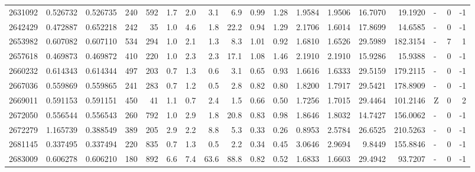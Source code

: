 \begin{tabular}{rrrrrrrrrrrrrrrlrr}
   2631092 & 0.526732 &   0.526735 &  240 &  592 &      1.7 &      2.0 &     3.1 &      6.9 &       0.99 &        1.28 &  1.9584 &  1.9506 &   16.7070 &   19.1920 &             - &        0 &         -1 \\
   2642429 & 0.472887 &   0.652218 &  242 &   35 &      1.0 &      4.6 &     1.8 &     22.2 &       0.94 &        1.29 &  2.1706 &  1.6014 &   17.8699 &   14.6585 &             - &        0 &         -1 \\
   2653982 & 0.607082 &   0.607110 &  534 &  294 &      1.0 &      2.1 &     1.3 &      8.3 &       1.01 &        0.92 &  1.6810 &  1.6526 &   29.5989 &  182.3154 &             - &        7 &          1 \\
   2657618 & 0.469873 &   0.469872 &  410 &  220 &      1.0 &      2.3 &     2.3 &     17.1 &       1.08 &        1.46 &  2.1910 &  2.1910 &   15.9286 &   15.9388 &             - &        0 &         -1 \\
   2660232 & 0.614343 &   0.614344 &  497 &  203 &      0.7 &      1.3 &     0.6 &      3.1 &       0.65 &        0.93 &  1.6616 &  1.6333 &   29.5159 &  179.2115 &             - &        0 &         -1 \\
   2667036 & 0.559869 &   0.559865 &  241 &  283 &      0.7 &      1.2 &     0.5 &      2.8 &       0.82 &        0.80 &  1.8200 &  1.7917 &   29.5421 &  178.8909 &             - &        0 &         -1 \\
   2669011 & 0.591153 &   0.591151 &  450 &   41 &      1.1 &      0.7 &     2.4 &      1.5 &       0.66 &        0.50 &  1.7256 &  1.7015 &   29.4464 &  101.2146 &             Z &        0 &          2 \\
   2672050 & 0.556544 &   0.556543 &  260 &  792 &      1.0 &      2.9 &     1.8 &     20.8 &       0.83 &        0.98 &  1.8646 &  1.8032 &   14.7427 &  156.0062 &             - &        0 &         -1 \\
   2672279 & 1.165739 &   0.388549 &  389 &  205 &      2.9 &      2.2 &     8.8 &      5.3 &       0.33 &        0.26 &  0.8953 &  2.5784 &   26.6525 &  210.5263 &             - &        0 &         -1 \\
   2681145 & 0.337495 &   0.337494 &  220 &  835 &      0.7 &      1.3 &     0.5 &      2.2 &       0.34 &        0.45 &  3.0646 &  2.9694 &    9.8449 &  155.8846 &             - &        0 &         -1 \\
   2683009 & 0.606278 &   0.606210 &  180 &  892 &      6.6 &      7.4 &    63.6 &     88.8 &       0.82 &        0.52 &  1.6833 &  1.6603 &   29.4942 &   93.7207 &             - &        0 &         -1 \\

\end{tabular}
